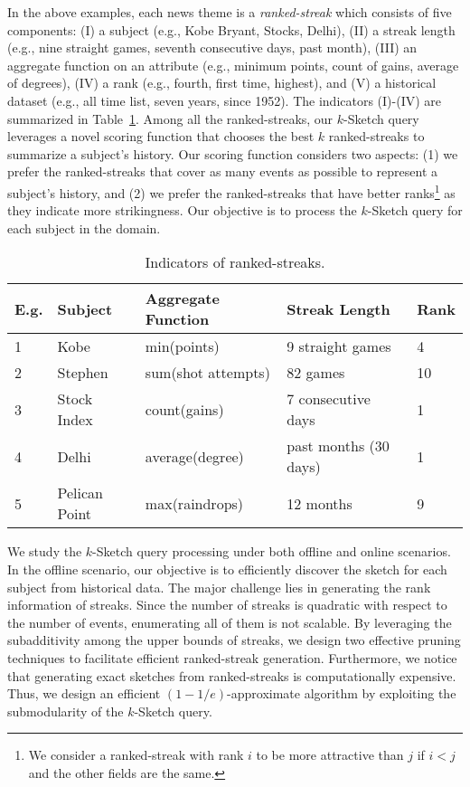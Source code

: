 In the above examples, each news theme is a \emph{ranked-streak} which consists of five components: (I)  a subject (e.g., Kobe Bryant, Stocks, Delhi), (II) a streak length (e.g., nine straight games, seventh consecutive days, past month), (III) an aggregate function on an attribute
(e.g., minimum points, count of gains, average of degrees), (IV) a rank (e.g., fourth, first time, highest), and (V) a historical dataset (e.g., all time list,
seven years, since 1952). The indicators (I)-(IV) are summarized in Table~\ref{tbl:news-example}.
%
Among all the ranked-streaks, our $k$-Sketch
query leverages a novel scoring function that chooses
the best $k$ ranked-streaks to summarize a subject's 
history. Our scoring function considers two aspects: (1) we prefer the ranked-streaks that cover as many events as possible to represent a subject's history, and (2) we prefer the ranked-streaks that have better ranks\footnote{We consider a ranked-streak with rank $i$ to be more attractive than $j$ if $i<j$ and the other fields are the same.} as they indicate more strikingness. Our objective is to process the $k$-Sketch query for each subject in the domain.

\begin{table}[t]
\caption{Indicators of ranked-streaks.}
\label{tbl:news-example}
\centering
\begin{tabular}{|l|l|l|l|l|}
\hline
\textbf{E.g.} & \textbf{Subject}& \textbf{Aggregate Function} & \textbf{Streak Length} & \textbf{Rank} \\
\hline
1 &  Kobe & min(points) & 9 straight games & 4 \\
\hline
2 &  Stephen & sum(shot attempts) & 82 games & 10 \\
\hline
3 &  Stock Index &count(gains) & 7 consecutive days & 1 \\
\hline
4 &  Delhi & average(degree) & past months (30 days) & 1 \\
\hline
5 &  Pelican Point & max(raindrops) & 12 months & 9 \\
\hline
\end{tabular}
\end{table}


We study the $k$-Sketch query processing under both offline and online scenarios. 
In the offline scenario, our objective is to efficiently discover the sketch for each subject 
from historical data. 
The major challenge lies in generating
the rank information of streaks. 
Since the number of streaks is quadratic with respect to the number of events, enumerating 
all of them is not scalable. By leveraging the subadditivity among the upper bounds of streaks, we design two effective pruning techniques to facilitate efficient ranked-streak generation.
Furthermore, we notice that generating exact sketches from ranked-streaks is computationally expensive. Thus, we design an efficient $(1-1/e)$-approximate algorithm by exploiting the submodularity of the $k$-Sketch query.

